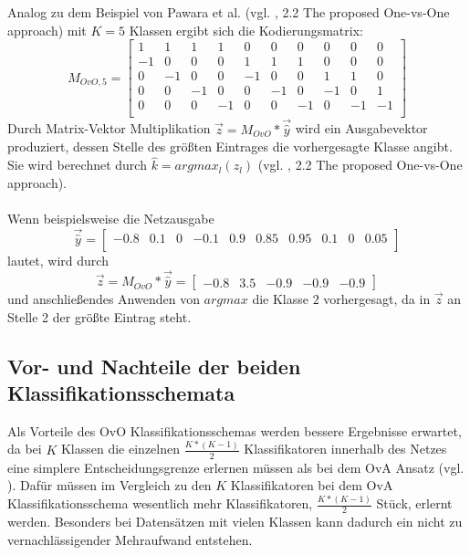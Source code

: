 \newpage
Analog zu dem Beispiel von Pawara et al. (vgl. \cite{pawaraPaper}, 2.2 The proposed One-vs-One approach) mit $K=5$ Klassen ergibt sich die Kodierungsmatrix:
\[M_{OvO,5}=
\begin{bmatrix}
1 & 1 & 1 & 1 & 0 & 0 & 0 & 0 & 0 & 0\\
-1 & 0 & 0 & 0 & 1 & 1 & 1 & 0 & 0 & 0\\
0 & -1 & 0 & 0 & -1 & 0 & 0 & 1 & 1 & 0\\
0 & 0 & -1 & 0 & 0 & -1 & 0 & -1 & 0 & 1\\
0 & 0 & 0 & -1 & 0 & 0 & -1 & 0 & -1 & -1\\
\end{bmatrix} 
\]
Durch Matrix-Vektor Multiplikation $\overrightarrow{z} = M_{OvO} * \overrightarrow{\widehat{y}}$ wird ein Ausgabevektor produziert, dessen Stelle des größten Eintrages die vorhergesagte Klasse angibt.\\
Sie wird berechnet durch $\widehat{k} = argmax_l (z_l)$ (vgl. \cite{pawaraPaper}, 2.2 The proposed One-vs-One approach).\\\\
Wenn beispielsweise die Netzausgabe
\[\overrightarrow{\widehat{y}} = \begin{bmatrix}
-0.8 & 0.1 & 0 & -0.1 & 0.9 & 0.85 & 0.95 & 0.1 & 0 & 0.05\\
\end{bmatrix}
\]
lautet, wird durch
\[\overrightarrow{z} = M_{OvO} * \overrightarrow{\widehat{y}} = \begin{bmatrix}
-0.8 & 3.5 & -0.9 & -0.9 & -0.9
\end{bmatrix}\]
und anschließendes Anwenden von $argmax$ die Klasse $2$ vorhergesagt, da in $\overrightarrow{z}$ an Stelle 2 der größte Eintrag steht.
\subsection{Vor- und Nachteile der beiden Klassifikationsschemata}
\label{ch:methodik_vorNachteile}
Als Vorteile des OvO Klassifikationsschemas werden bessere Ergebnisse erwartet, da bei $K$ Klassen die einzelnen $\frac{K*(K-1)}{2}$ Klassifikatoren innerhalb des Netzes eine simplere Entscheidungsgrenze erlernen müssen als bei dem OvA Ansatz (vgl. \cite{pawaraPaper}).
Dafür müssen im Vergleich zu den $K$ Klassifikatoren bei dem OvA Klassifikationsschema wesentlich mehr Klassifikatoren, $\frac{K*(K-1)}{2}$ Stück, erlernt werden. Besonders bei Datensätzen mit vielen Klassen kann dadurch ein nicht zu vernachlässigender Mehraufwand entstehen.

